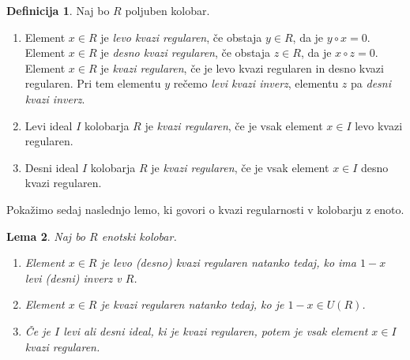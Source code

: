 \documentclass[a4paper, 12pt]{amsart}
\theoremstyle{definition} %
\newtheorem{definicija}{Definicija}[section]
\theoremstyle{plain} %
\newtheorem{lema}[definicija]{Lema}
\begin{document}
\begin{definicija}
Naj bo $R$ poljuben kolobar. 
\begin{enumerate}
\item Element $x\in R $ je \emph{levo kvazi regularen}, če obstaja $y\in R$, da je $y\circ x=0$. Element $x\in R$ je \emph{desno kvazi regularen}, če obstaja $z\in R$, da je $x\circ z = 0$. Element $x\in R$ je \emph{kvazi regularen}, če je levo kvazi regularen in desno kvazi regularen. Pri tem elementu $y$ rečemo \emph{levi kvazi inverz}, elementu $z$ pa \emph{desni kvazi inverz}.
\item Levi ideal $I$ kolobarja $R$ je \emph{kvazi regularen}, če je vsak element $x\in I$ levo kvazi regularen.
\item Desni ideal $I$ kolobarja $R$ je \emph{kvazi regularen}, če je vsak element $x\in I$ desno kvazi regularen.
\end{enumerate}
\end{definicija}

Pokažimo sedaj naslednjo lemo, ki govori o kvazi regularnosti v kolobarju z enoto.

\begin{lema}
\label{kvaziRegularen-enotskiR}
Naj bo $R$ enotski kolobar. 
\begin{enumerate}
\item Element $x\in R$ je levo (desno) kvazi regularen natanko tedaj, ko ima $1-x$ levi (desni) inverz v $R$.
\item Element $x\in R$ je kvazi regularen natanko tedaj, ko je $1-x \in U(R)$.
\item Če je $I$ levi ali desni ideal, ki je kvazi regularen, potem je vsak element $x\in I$ kvazi regularen.
\end{enumerate}
\end{lema}
\end{document}
